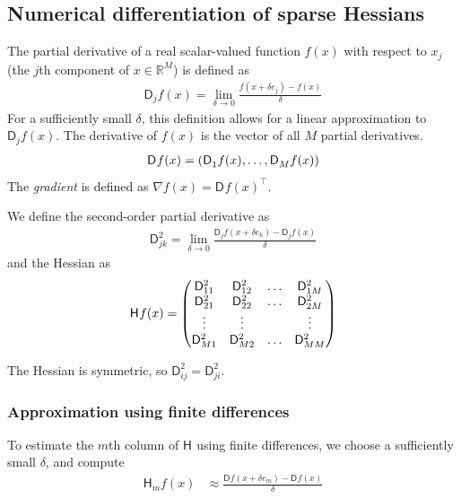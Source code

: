 \documentclass[jss]{jss}\usepackage[]{graphicx}\usepackage[]{color}
\newcommand{\parD}[3]{\mathsf{D}^{#1}_{#2}#3}
\newcommand{\hess}[2]{\mathsf{H}_{#1}#2}
\newcommand{\Real}[1]{\mathbb{R}^{#1}}
\begin{document}
\subsection[Numerical differentiation of sparse Hessians]{Numerical
  differentiation of sparse Hessians}\label{sec:numdiff}

The partial derivative of a real scalar-valued function $f(x)$ with
respect to $x_j$ (the $j$th
component of $x\in\Real{M}$) is defined as
\begin{align}
  \label{eq:defParD}
\parD{}{j}{f(x)}=\lim\limits_{\delta\to 0}\frac{f(x+\delta e_j)-f(x)}{\delta}
\end{align}
For a sufficiently small $\delta$, this definition allows for a
linear approximation to $\parD{}{j}{f(x)}$.  The derivative of $f(x)$
is the vector of all $M$ partial derivatives.
\begin{align}
  \parD{}{}{f(x)}=\left(\parD{}{1}{f(x)},\mathellipsis,\parD{}{M}{f(x)}\right)
  \end{align}
 The \emph{gradient} is defined as $\nabla f(x)=\parD{}{}{f(x)}^\top$.

We define the second-order partial derivative as
\begin{align}
  \label{eq:14}
  \parD{2}{jk}{}=\lim\limits_{\delta\to 0}\frac{\parD{}{j}{f(x+\delta e_k)}-\parD{}{j}{f(x)}}{\delta}
\end{align}
and the Hessian as
\begin{align}
  \label{eq:15}
  \hess{}{f(x)}=
  \begin{pmatrix}
    \parD{2}{11}{}&  \parD{2}{12}{}&  \mathellipsis &  \parD{2}{1M}{}\\
    \parD{2}{21}{}&  \parD{2}{22}{}&  \mathellipsis &  \parD{2}{2M}{}\\
    \vdots&\vdots&&\vdots\\
    \parD{2}{M1}{}&  \parD{2}{M2}{}&  \mathellipsis &  \parD{2}{MM}{}
    \end{pmatrix}
\end{align}

The Hessian is symmetric, so $\parD{2}{ij}{}=\parD{2}{ji}{}$.

\subsubsection[Approximation using finite differences]{Approximation using finite differences}

To estimate the $m$th column of $\hess{}{}$ using finite differences, we choose a
sufficiently small $\delta$, and compute
\begin{align}
  \label{eq:1}
  \hess{m}{f(x)}&\approx\frac{\parD{}{}{f(x+\delta e_m)}-\parD{}{}{f(x)}}{\delta}
\end{align}
\end{document}
